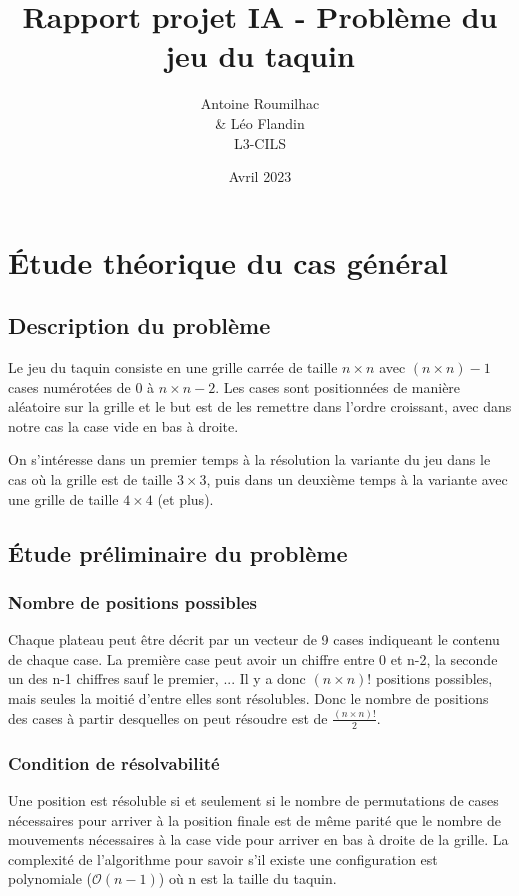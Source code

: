 \documentclass[a4paper, 12pt]{article}
\title{Rapport projet IA - Problème du jeu du taquin}
\author{Antoine Roumilhac\\
    \& Léo Flandin\\
    L3-CILS}
\date{Avril 2023}
\begin{document}
\maketitle

\section{Étude théorique du cas général}

\subsection{Description du problème}
Le jeu du taquin consiste en une grille carrée de taille $n\times n$ avec $(n\times n) - 1$ cases numérotées de 0 à $n \times n - 2$.
Les cases sont positionnées de manière aléatoire sur la grille et le but est de les remettre dans l'ordre croissant, avec dans notre cas la case vide en bas à droite.


On s'intéresse dans un premier temps à la résolution la variante du jeu dans le cas où la grille est de taille $3 \times 3$, puis dans un deuxième temps à la variante avec une grille de taille $4 \times 4$ (et plus).

\subsection{Étude préliminaire du problème}

\subsubsection{Nombre de positions possibles}
Chaque plateau peut être décrit par un vecteur de 9 cases indiqueant le contenu de chaque case. La première case peut avoir un chiffre entre 0 et n-2, la seconde un des n-1 chiffres sauf le premier, ...
Il y a donc $(n \times n)!$ positions possibles, mais seules la moitié d'entre elles sont résolubles.
Donc le nombre de positions des cases à partir desquelles on peut résoudre est de $\frac{(n\times n)!}{2}$.

\subsubsection{Condition de résolvabilité}
Une position est résoluble si et seulement si le nombre de permutations de cases nécessaires pour arriver à la position finale est de même parité que le nombre de mouvements nécessaires à la case vide pour arriver en bas à droite de la grille.
La complexité de l'algorithme pour savoir s'il existe une configuration est polynomiale ($\mathcal{O}(n-1)$) où n est la taille du taquin.
\end{document}
